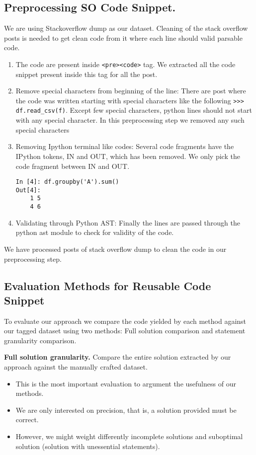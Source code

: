 \subsection{Preprocessing SO Code Snippet.}

We are using Stackoverflow dump as our dataset. Cleaning of the stack overflow posts is needed to get clean code from it where each line should valid parsable code.
\begin{enumerate}        
	\item The code are present inside \texttt{<pre><code>} tag. We extracted all the code snippet present inside this tag for all the post.    
	\item Remove special characters from beginning of the line: There are post where the code was written starting with special characters like the following \texttt{>>> df.read\_csv(f)}. Except few special characters, python lines should not start with any special character. In this preprocessing step we removed any such special characters
          
	\item Removing Ipython terminal like codes: Several code fragments have the IPython tokens, IN and OUT, which has been removed. We only pick the code fragment between IN and OUT.
    \begin{lstlisting}
In [4]: df.groupby('A').sum()
Out[4]:
	1 5
	4 6
\end{lstlisting}
    
    \item Validating through Python AST: Finally the lines are passed through the python ast module to check for validity of the code.
    
\end{enumerate}

We have processed posts of stack overflow dump to clean the code in our preprocessing step.

\subsection{Evaluation Methods for Reusable Code Snippet}
     
To evaluate our approach we compare the code yielded by each method against our tagged dataset using two methods: Full solution comparison and statement granularity comparison.



\textbf{Full solution granularity.}
Compare the entire solution extracted by our approach against the manually crafted dataset.
\begin{itemize} 
	\item This is the most important evaluation to argument the usefulness of our methods.  
    \item We are only interested on precision, that is, a solution provided must be correct.
    \item However, we might weight differently incomplete solutions and suboptimal solution (solution with unessential statements).
\end{itemize}

